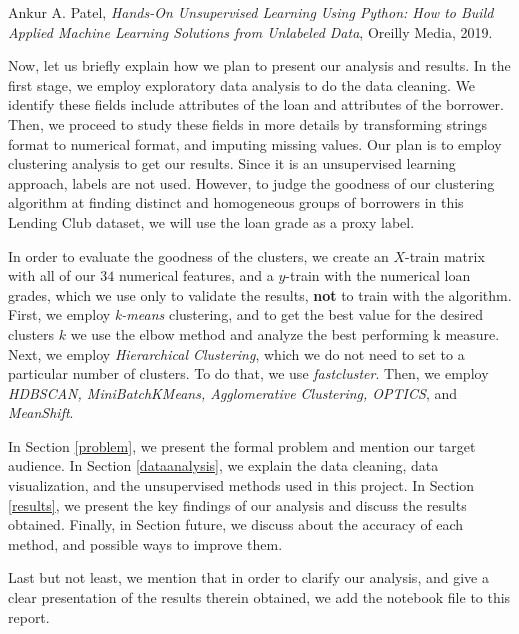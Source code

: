 \documentclass[a4paper,11pt]{amsart}
\begin{document}
\begin{flushleft}
Ankur A. Patel, \textit{Hands-On Unsupervised Learning Using Python: How to Build Applied Machine Learning Solutions from Unlabeled Data}, Oreilly Media, 2019.
\end{flushleft}

\medbreak

Now, let us briefly explain how we plan to present our analysis and results. In the first stage, we employ exploratory data analysis to do the data cleaning. We identify these fields include attributes of the loan and attributes of the borrower. Then, we proceed to study these fields in more details by transforming strings format to numerical format, and imputing missing values. Our plan is to employ clustering analysis to get our results. Since it is an unsupervised learning approach, labels are not used. However, to judge the goodness of our clustering algorithm at finding distinct and homogeneous groups of borrowers in this Lending Club dataset, we will use the loan grade as a proxy label.

\medbreak

In order to evaluate the goodness of the clusters, we create an $X$-train matrix with all of our $34$ numerical features, and a $y$-train with the numerical loan grades, which we use only to validate the results, \textbf{not} to train with the algorithm. First, we employ \emph{k-means} clustering, and to get the best value for the desired clusters $k$ we use the elbow method and analyze the best performing k measure. Next, we employ \emph{Hierarchical Clustering}, which we do not need to set to a particular number of clusters. To do that, we use \emph{fastcluster}. Then, we employ \emph{HDBSCAN, MiniBatchKMeans, Agglomerative Clustering, OPTICS}, and \emph{MeanShift}.

\medbreak

In Section \ref{problem}, we present the formal problem and mention our target audience. In Section \ref{dataanalysis}, we explain the data cleaning, data visualization, and the unsupervised methods used in this project. In Section \ref{results}, we present the key findings of our analysis and discuss the results obtained. Finally, in Section {future}, we discuss about the accuracy of each method, and possible ways to improve them.

\medbreak

Last but not least, we mention that in order to clarify our analysis, and give a clear presentation of the results therein obtained, we add the notebook file to this report. 
\end{document}
